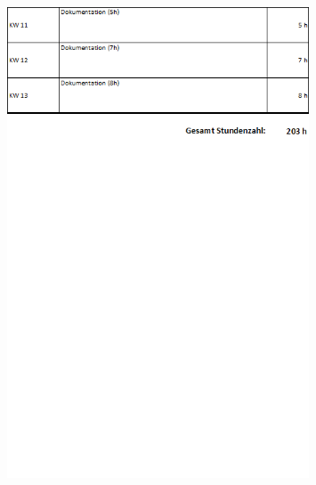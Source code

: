 \begin{figure} [H]
	\centering
	\includegraphics[width=0.8\textwidth]{form/ArbeitsnachweisBointner3von3.png}
\end{figure}

\newpage
{}
